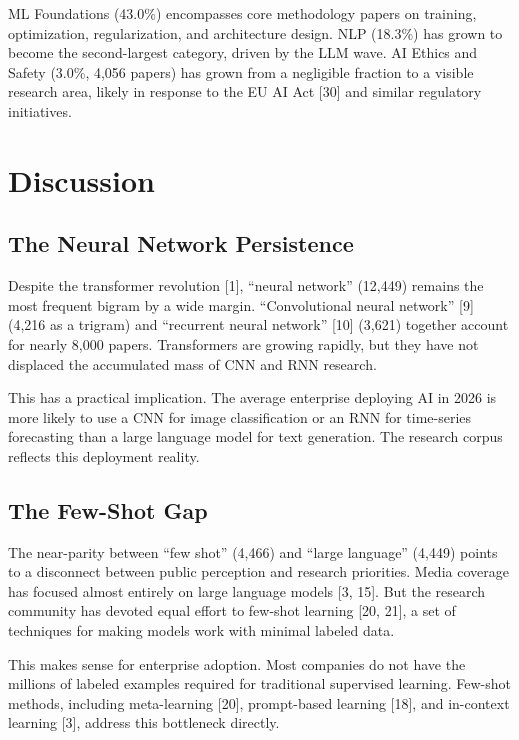 \documentclass[11pt]{article}
\begin{document}
ML Foundations (43.0\%) encompasses core methodology papers on training, optimization, regularization, and architecture design. NLP (18.3\%) has grown to become the second-largest category, driven by the LLM wave. AI Ethics and Safety (3.0\%, 4,056 papers) has grown from a negligible fraction to a visible research area, likely in response to the EU AI Act [30] and similar regulatory initiatives.

\section{Discussion}
\label{sec:discussion}

\subsection{The Neural Network Persistence}

Despite the transformer revolution [1], ``neural network'' (12,449) remains the most frequent bigram by a wide margin. ``Convolutional neural network'' [9] (4,216 as a trigram) and ``recurrent neural network'' [10] (3,621) together account for nearly 8,000 papers. Transformers are growing rapidly, but they have not displaced the accumulated mass of CNN and RNN research.

This has a practical implication. The average enterprise deploying AI in 2026 is more likely to use a CNN for image classification or an RNN for time-series forecasting than a large language model for text generation. The research corpus reflects this deployment reality.

\subsection{The Few-Shot Gap}

The near-parity between ``few shot'' (4,466) and ``large language'' (4,449) points to a disconnect between public perception and research priorities. Media coverage has focused almost entirely on large language models [3, 15]. But the research community has devoted equal effort to few-shot learning [20, 21], a set of techniques for making models work with minimal labeled data.

This makes sense for enterprise adoption. Most companies do not have the millions of labeled examples required for traditional supervised learning. Few-shot methods, including meta-learning [20], prompt-based learning [18], and in-context learning [3], address this bottleneck directly.
\end{document}
